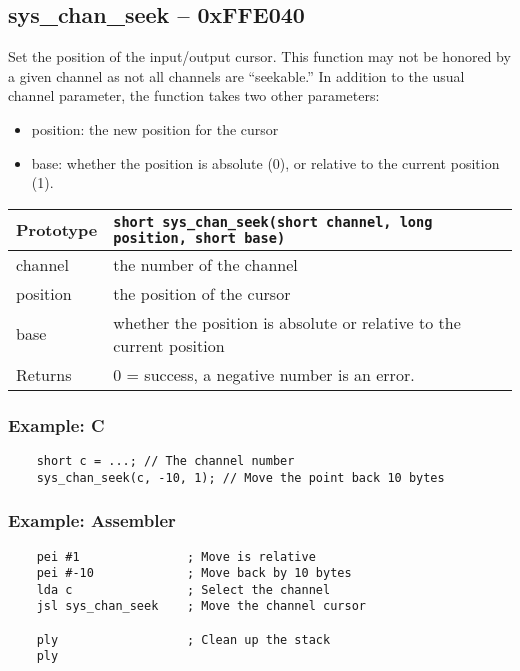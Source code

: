 \subsection*{sys\_chan\_seek -- 0xFFE040}
Set the position of the input/output cursor. This function may not be honored by a given channel as not all channels are ``seekable.''
In addition to the usual channel parameter, the function takes two other parameters:
\begin{itemize}
\item position: the new position for the cursor
\item base: whether the position is absolute (0), or relative to the current position (1).
\end{itemize}

\bigskip

\begin{tabular}{|l||l|} \hline
Prototype & \lstinline!short sys_chan_seek(short channel, long position, short base)! \\ \hline
channel & the number of the channel \\ \hline
position & the position of the cursor \\ \hline
base & whether the position is absolute or relative to the current position \\ \hline
Returns & 0 = success, a negative number is an error. \\ \hline
\end{tabular}

\subsubsection*{Example: C}
\begin{lstlisting}
    short c = ...; // The channel number
    sys_chan_seek(c, -10, 1); // Move the point back 10 bytes
\end{lstlisting}

\subsubsection*{Example: Assembler}
\begin{verbatim}
    pei #1               ; Move is relative
    pei #-10             ; Move back by 10 bytes
    lda c                ; Select the channel
    jsl sys_chan_seek    ; Move the channel cursor

    ply                  ; Clean up the stack
    ply
\end{verbatim}

